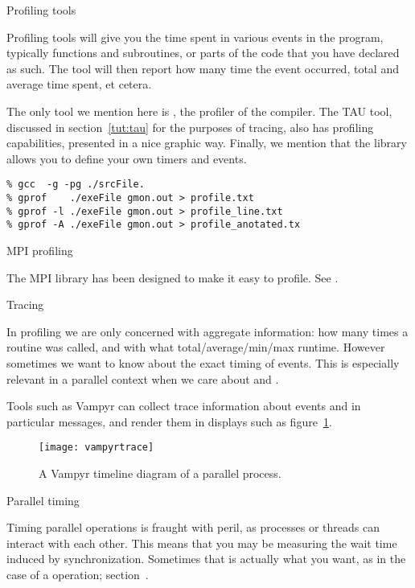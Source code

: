  {Profiling tools}

Profiling tools will give you the time spent in various events in the
program, typically functions and subroutines, or parts of the code
that you have declared as such. The tool will then report how many
time the event occurred, total and average time spent, et cetera.

The only tool we mention here is , the profiler of
the  compiler.
The TAU tool, discussed in section~\ref{tut:tau} for the purposes of tracing,
also has profiling capabilities, presented in a nice graphic way.
Finally, we mention that the  library
allows you to define your own timers and events.

\begin{verbatim}
% gcc  -g -pg ./srcFile.
% gprof    ./exeFile gmon.out > profile.txt
% gprof -l ./exeFile gmon.out > profile_line.txt
% gprof -A ./exeFile gmon.out > profile_anotated.tx
\end{verbatim}

 {MPI profiling}

The MPI library has been designed to make it easy to profile.
See .

 {Tracing}

In profiling we are only concerned with aggregate information: how
many times a routine was called, and with what total/average/min/max
runtime. However sometimes we want to know about the exact timing of
events. This is especially relevant in a parallel context when we care
about  and .

Tools such as Vampyr can collect trace information about
events and in particular messages, and render them in displays such as
figure~\ref{fig:vampyr}.
\begin{figure}[ht]
  \texttt{[image: vampyrtrace]}
  \caption{A Vampyr timeline diagram of a parallel process.}
  \label{fig:vampyr}
\end{figure}


 {Parallel timing}

Timing parallel operations is fraught with peril,
as processes or threads can interact with each other.
This means that you may be measuring the wait time
induced by synchronization.
Sometimes that is actually what you want,
as in the case of a  operation;
section~.

